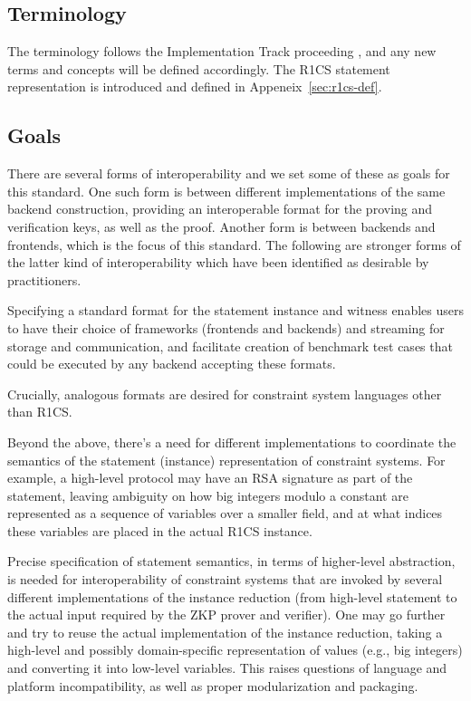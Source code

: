 \documentclass[a4paper,12pt]{article}
\begin{document}
\subsection{Terminology}
The terminology follows the Implementation Track proceeding \cite{ZKProofImplementation}, and any new terms and concepts will be defined accordingly. The R1CS statement representation is introduced and defined in Appeneix~\ref{sec:r1cs-def}.

\subsection{Goals} 
\label{goals}

There are several forms of interoperability and we set some of these as goals for this standard. One such form is between different implementations of the same backend construction, providing an interoperable format for the proving and verification keys, as well as the proof. Another form is between backends and frontends, which is the focus of this standard. The following are stronger forms of the latter kind of interoperability which have been identified as desirable by practitioners.

Specifying a standard format for the statement instance and witness enables users to have their choice of frameworks (frontends and backends) and streaming for storage and communication, and facilitate creation of benchmark test cases that could be executed by any backend accepting these formats.
 
Crucially, analogous formats are desired for constraint system languages other than R1CS.


Beyond the above, there’s a need for different implementations to coordinate the semantics of the statement (instance) representation of constraint systems. For example, a high-level protocol may have an RSA signature as part of the statement, leaving ambiguity on how big integers modulo a constant are represented as a sequence of variables over a smaller field, and at what indices these variables are placed in the actual R1CS instance.

Precise specification of statement semantics, in terms of higher-level abstraction, is needed for interoperability of constraint systems that are invoked by several different implementations of the instance reduction (from high-level statement to the actual input required by the ZKP prover and verifier). One may go further and try to reuse the actual implementation of the instance reduction, taking a high-level and possibly domain-specific representation of values (e.g., big  integers) and converting it into low-level variables. This raises questions of language and platform incompatibility, as well as proper modularization and packaging.
\end{document}
